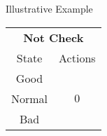 \documentclass[usenames,dvipsnames,aspectratio=169,11pt, envcountsect, handout]{beamer}
\begin{document}
\begin{frame}[noframenumbering]{Illustrative Example}
\begin{table}[H]
\begin{minipage}{0.29\textwidth}
		\end{minipage}\hspace{0.5cm} %
		\begin{minipage}{0.29\textwidth}
			\centering
			\begin{tabular}{c | c}
				\multicolumn{2}{c}{\textbf{Not Check}} \\
				State  & Actions                       \\
				\hline
				Good   & \multirow{3}{*}{ \( 0 \)}     \\
				Normal &                               \\
				Bad    &                               \\
			\end{tabular}
			\vspace{0.5cm} %
		\end{minipage}
	\end{table}

\end{frame}
\end{document}
